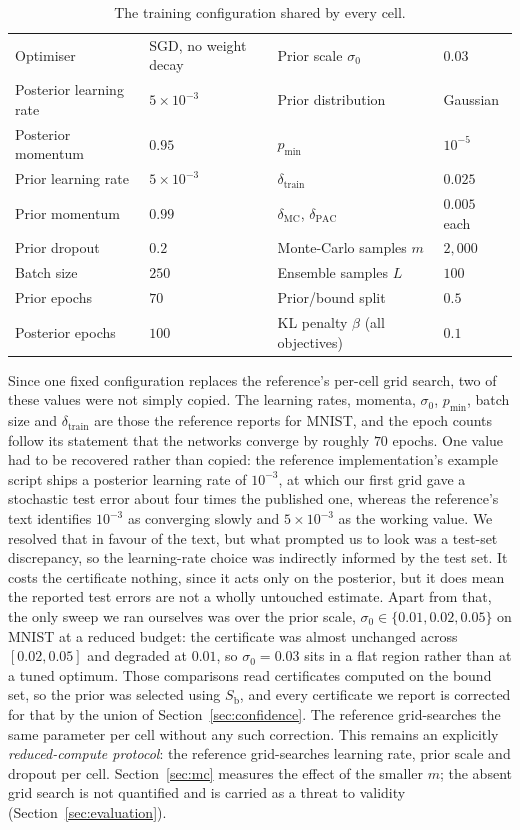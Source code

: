 \begin{table}[h]\centering\small
\caption{The training configuration shared by every cell.}\label{tab:hparams}
\begin{tabular}{@{}llll@{}}
\toprule
Optimiser & SGD, no weight decay & Prior scale $\sigma_0$ & $0.03$ \\
Posterior learning rate & $5\times10^{-3}$ & Prior distribution & Gaussian \\
Posterior momentum & $0.95$ & $p_{\min}$ & $10^{-5}$ \\
Prior learning rate & $5\times10^{-3}$ & $\delta_{\mathrm{train}}$ & $0.025$ \\
Prior momentum & $0.99$ & $\delta_{\mathrm{MC}}$, $\delta_{\mathrm{PAC}}$ & $0.005$ each \\
Prior dropout & $0.2$ & Monte-Carlo samples $m$ & $2{,}000$ \\
Batch size & $250$ & Ensemble samples $L$ & $100$ \\
Prior epochs & $70$ & Prior/bound split & $0.5$ \\
Posterior epochs & $100$ & KL penalty $\beta$ (all objectives) & $0.1$ \\
\bottomrule
\end{tabular}
\end{table}

Since one fixed configuration replaces the reference's per-cell grid search, two
of these values were not simply copied.
The learning rates, momenta, $\sigma_0$, $p_{\min}$, batch size and
$\delta_{\mathrm{train}}$ are those the reference reports for MNIST, and the epoch
counts follow its statement that the networks converge by roughly $70$ epochs. One
value had to be recovered rather than copied: the reference implementation's
example script ships a posterior learning rate of $10^{-3}$, at which our first
grid gave a stochastic test error about four times the published one, whereas the
reference's text identifies $10^{-3}$ as converging slowly and $5\times10^{-3}$ as
the working value. We resolved that in favour of the text, but what prompted us
to look was a test-set discrepancy, so the learning-rate choice was indirectly
informed by the test set. It costs the certificate nothing, since it acts only on
the posterior, but it does mean the reported test errors are not a wholly
untouched estimate. Apart from that, the only sweep we ran ourselves was over the prior scale,
$\sigma_0\in\{0.01,0.02,0.05\}$ on MNIST at a reduced budget: the certificate was
almost unchanged across $[0.02,0.05]$ and degraded at $0.01$, so $\sigma_0=0.03$
sits in a flat region rather than at a tuned optimum. Those comparisons read
certificates computed on the bound set, so the prior was selected using
$S_{\mathrm b}$, and every certificate we report is corrected for that by the
union of Section~\ref{sec:confidence}. The reference grid-searches the same
parameter per cell without any such correction. This remains an explicitly
\emph{reduced-compute protocol}: the reference grid-searches learning rate, prior
scale and dropout per cell. Section~\ref{sec:mc} measures the effect of the
smaller $m$; the absent grid search is not quantified and is carried as a threat
to validity (Section~\ref{sec:evaluation}).

